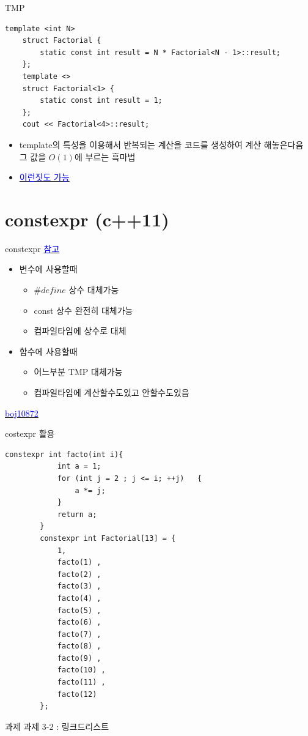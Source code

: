 \documentclass[10pt]{beamer}
\begin{document}
\begin{frame}[fragile]{TMP}
    
    \begin{lstlisting}[style = CppStyle]
    template <int N>
    struct Factorial {
        static const int result = N * Factorial<N - 1>::result;
    };
    template <>
    struct Factorial<1> {
        static const int result = 1;
    };
    cout << Factorial<4>::result; 
    \end{lstlisting}
    
    \begin{itemize}
        \item template의 특성을 이용해서 반복되는 계산을 코드를 생성하여 계산 해놓은다음 그 값을 $O(1)$에 부르는 흑마법
        \item \href{https://libsora.so/posts/friday-the-13th-tmp/}{\textcolor{blue}{이런짓도 가능}}
    \end{itemize}
\end{frame}    


\section{constexpr (c++11)}

\begin{frame}[fragile]{constexpr}
    \href{https://youtu.be/o9FXctFYlnY}{\textcolor{blue}{참고}}
    \begin{itemize}
        \item 변수에 사용할때
        \begin{itemize}
            \item $\#define$ 상수 대체가능
            \item const 상수 완전히 대체가능
            \item 컴파일타임에 상수로 대체
        \end{itemize}
        \item 함수에 사용할때
        \begin{itemize}
            \item 어느부분 TMP 대체가능
            \item 컴파일타임에 계산할수도있고 안할수도있음
        \end{itemize}
    \end{itemize}
    \href{https://www.acmicpc.net/problem/10872}{\textcolor{blue}{boj10872}}
\end{frame} 


\begin{frame}[fragile]{costexpr 활용}
    \begin{lstlisting}[style = CppStyle]
        constexpr int facto(int i){
            int a = 1;
            for (int j = 2 ; j <= i; ++j)	{
                a *= j;
            }
            return a;
        }
        constexpr int Factorial[13] = {
            1,
            facto(1) ,
            facto(2) ,
            facto(3) ,
            facto(4) ,
            facto(5) ,
            facto(6) ,
            facto(7) ,
            facto(8) ,
            facto(9) ,
            facto(10) ,
            facto(11) ,
            facto(12)
        };
    \end{lstlisting}    
\end{frame}


\begin{frame}{과제}
    과제 3-2 : 링크드리스트
\end{frame}    
\end{document}
